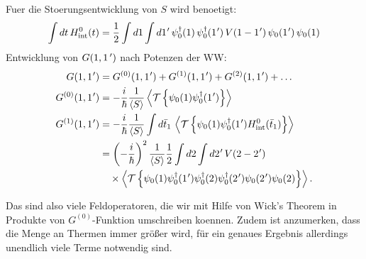 Fuer die Stoerungsentwicklung von $S$ wird benoetigt:
\begin{equation}
  \int dt\,H_{\mathrm{int}}^{0}(t)=\frac{1}{2}\int d1\int d1\mkern1mu'\,\psi_{0}^{\dagger}(1)\,\psi_{0}^{\dagger}(1\mkern1mu')\,V(1-1\mkern1mu')\,\psi_{0}(1\mkern1mu')\,\psi_{0}(1)
\end{equation}
Entwicklung von $G(1,1\mkern3mu')$ nach Potenzen der WW:
\begin{equation}\label{f:entw_G(1,1')}
  \begin{aligned}
    G(1,1\mkern1mu')       & =G^{(0)}(1,1\mkern1mu')+G^{(1)}(1,1\mkern1mu')+G^{(2)}(1,1\mkern1mu')+\ldots                                                                                              \\
    G^{(0)}(1,1\mkern1mu') & =-\frac{i}{\hbar}\frac{1}{\left\langle S\right\rangle}\left\langle\mathcal T\left\{\psi_{0}(1)\psi_{0}^{\dagger}(1\mkern1mu')\right\}\right\rangle                                                               \\
    G^{(1)}(1,1\mkern1mu') & =-\frac{i}{\hbar}\frac{1}{\left\langle S\right\rangle}\int d\bar t_{1}\,\left\langle\mathcal T\left\{\psi_{0}(1)\psi_{0}^{\dagger}(1\mkern1mu')H_{\mathrm{int}}^{0}(\bar t_{1})\right\}\right\rangle             \\
                           & =\left(-\frac{i}{\hbar}\right)^{2}\frac{1}{\left\langle S\right\rangle}\frac{1}{2}\int d2\int d2\mkern1mu'\,V(2-2\mkern1mu')                                                                  \\
                           & \quad\times\left\langle\mathcal T\left\{\psi_{0}(1)\psi_{0}^{\dagger}(1\mkern1mu')\psi_{0}^{\dagger}(2)\psi_{0}^{\dagger}(2\mkern1mu')\psi_{0}(2\mkern1mu')\psi_{0}(2)\right\}\right\rangle.
  \end{aligned}
\end{equation}

Das sind also viele Feldoperatoren, die wir mit Hilfe von Wick's Theorem in Produkte von $G^{(0)}$-Funktion umschreiben koennen. Zudem ist anzumerken, dass die Menge an Thermen immer größer wird, für ein genaues Ergebnis allerdings unendlich viele Terme notwendig sind.